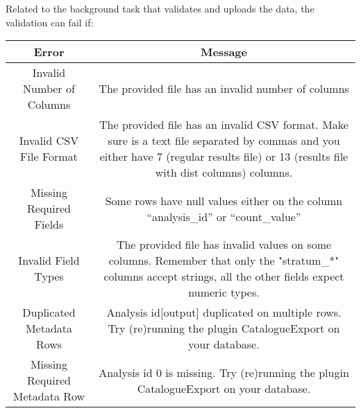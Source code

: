 \documentclass[
]{book}
\begin{document}
Related to the background task that validates and uploads the data, the validation can fail if:

\begin{longtable}[]{@{}cc@{}}
\toprule
\begin{minipage}[b]{0.47\columnwidth}\centering
Error\strut
\end{minipage} & \begin{minipage}[b]{0.47\columnwidth}\centering
Message\strut
\end{minipage}\tabularnewline
\midrule
\endhead
\begin{minipage}[t]{0.47\columnwidth}\centering
Invalid Number of Columns\strut
\end{minipage} & \begin{minipage}[t]{0.47\columnwidth}\centering
The provided file has an invalid number of columns\strut
\end{minipage}\tabularnewline
\begin{minipage}[t]{0.47\columnwidth}\centering
Invalid CSV File Format\strut
\end{minipage} & \begin{minipage}[t]{0.47\columnwidth}\centering
The provided file has an invalid CSV format. Make sure is a text file separated by commas and you either have 7 (regular results file) or 13 (results file with dist columns) columns.\strut
\end{minipage}\tabularnewline
\begin{minipage}[t]{0.47\columnwidth}\centering
Missing Required Fields\strut
\end{minipage} & \begin{minipage}[t]{0.47\columnwidth}\centering
Some rows have null values either on the column ``analysis\_id'' or ``count\_value''\strut
\end{minipage}\tabularnewline
\begin{minipage}[t]{0.47\columnwidth}\centering
Invalid Field Types\strut
\end{minipage} & \begin{minipage}[t]{0.47\columnwidth}\centering
The provided file has invalid values on some columns. Remember that only the "stratum\_*" columns accept strings, all the other fields expect numeric types.\strut
\end{minipage}\tabularnewline
\begin{minipage}[t]{0.47\columnwidth}\centering
Duplicated Metadata Rows\strut
\end{minipage} & \begin{minipage}[t]{0.47\columnwidth}\centering
Analysis id{[}output{]} duplicated on multiple rows. Try (re)running the plugin CatalogueExport on your database.\strut
\end{minipage}\tabularnewline
\begin{minipage}[t]{0.47\columnwidth}\centering
Missing Required Metadata Row\strut
\end{minipage} & \begin{minipage}[t]{0.47\columnwidth}\centering
Analysis id 0 is missing. Try (re)running the plugin CatalogueExport on your database.\strut
\end{minipage}\tabularnewline
\bottomrule
\end{longtable}
\end{document}
